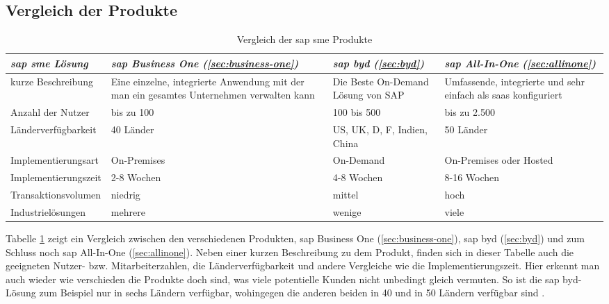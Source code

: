 \subsection{Vergleich der Produkte}
\begin{table}[h]
\begin{center}
\begin{tabular}{p{3.5cm}||p{3cm}|p{3cm}|p{3cm}}
  \emph{\gls{sap} \gls{sme} Lösung} & \emph{\gls{sap} Business One (\ref{sec:business-one})} & \emph{\gls{sap} \gls{byd} (\ref{sec:byd})} & \emph{\gls{sap} All-In-One (\ref{sec:allinone})}\\	
  \hline
  kurze Beschreibung & Eine einzelne, integrierte Anwendung mit der man ein gesamtes Unternehmen verwalten kann & Die Beste On-Demand Lösung von SAP & Umfassende, integrierte und sehr einfach als \gls{saas} konfiguriert\\
  \hline
  Anzahl der Nutzer & bis zu 100 & 100 bis 500 &  bis zu 2.500\\
  \hline
  Länderverfügbarkeit & 40 Länder & US, UK, D, F, Indien, China & 50 Länder\\
  \hline	
  Implementierungsart & On-Premises & On-Demand & On-Premises oder Hosted\\
  \hline	
  Implementierungszeit & 2-8 Wochen & 4-8 Wochen & 8-16 Wochen\\
  \hline	
  Transaktionsvolumen & niedrig & mittel & hoch\\
  \hline	
  Industrielösungen & mehrere & wenige & viele\\
  \hline				
\end{tabular}
\end{center}
\caption{Vergleich der \gls{sap} \gls{sme} Produkte} 
\label{tab:smevergleich}
\end{table}

Tabelle \ref{tab:smevergleich} zeigt ein Vergleich zwischen den verschiedenen Produkten, \gls{sap} Business One (\ref{sec:business-one}), \gls{sap} \gls{byd} (\ref{sec:byd}) und zum Schluss noch \gls{sap} All-In-One (\ref{sec:allinone}). Neben einer kurzen Beschreibung zu dem Produkt, finden sich in dieser Tabelle auch die geeigneten Nutzer- bzw. Mitarbeiterzahlen, die Länderverfügbarkeit und andere Vergleiche wie die Implementierungszeit. Hier erkennt man auch wieder wie verschieden die Produkte doch sind, was viele potentielle Kunden nicht unbedingt gleich vermuten. So ist die \gls{sap} \gls{byd}-Lösung zum Beispiel nur in sechs Ländern verfügbar, wohingegen die anderen beiden in 40 und in 50 Ländern verfügbar sind \cite{SAPin24hrs}.